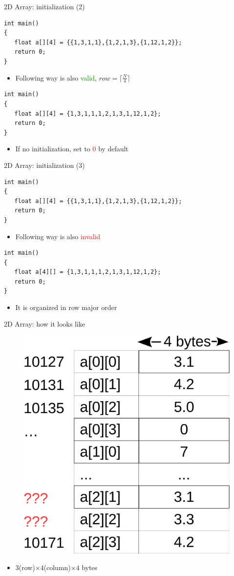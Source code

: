 \begin{frame}[fragile]{2D Array: initialization (2)}
\begin{lstlisting}
int main()
{
   float a[][4] = {{1,3,1,1},{1,2,1,3},{1,12,1,2}};
   return 0;
}
\end{lstlisting}
\begin{itemize}
	\item {Following way is also \textcolor{green}{valid}, $row=\lceil\frac{N}{4}\rceil$}
\end{itemize}
\begin{lstlisting}
int main()
{
   float a[][4] = {1,3,1,1,1,2,1,3,1,12,1,2};
   return 0;
}
\end{lstlisting}
\begin{itemize}
	\item {If no initialization, set to \textcolor{red}{0} by default}
\end{itemize}
\end{frame}

\begin{frame}[fragile]{2D Array: initialization (3)}
\begin{lstlisting}
int main()
{
   float a[][4] = {{1,3,1,1},{1,2,1,3},{1,12,1,2}};
   return 0;
}
\end{lstlisting}
\begin{itemize}
	\item {Following way is also \textcolor{red}{invalid}}
\end{itemize}
\begin{lstlisting}
int main()
{
   float a[4][] = {1,3,1,1,1,2,1,3,1,12,1,2};
   return 0;
}
\end{lstlisting}
\begin{itemize}
	\item {It is organized in row major order}
\end{itemize}
\end{frame}

\begin{frame}[fragile]{2D Array: how it looks like}
\begin{figure}
	\includegraphics[width=0.4\linewidth]{figs/farray2d.pdf}
\end{figure}
\begin{itemize}
	\item {$3$(row)${\times}4$(column)${\times}4$ bytes}
\end{itemize}
\end{frame}

